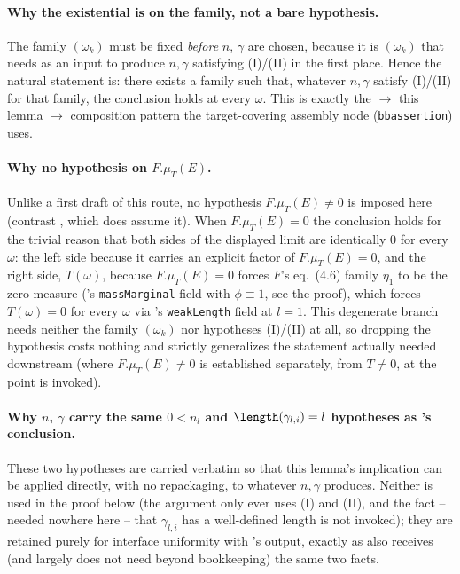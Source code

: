\begin{lemma}
  \paragraph{Why the existential is on the family, not a bare hypothesis.} The family $(\omega_k)$
  must be fixed \emph{before} $n$, $\gamma$ are chosen, because it is $(\omega_k)$ that
   needs as an input to produce $n,\gamma$ satisfying (I)/(II) in the
  first place. Hence the natural statement is: there exists a family such that, whatever $n,\gamma$
  satisfy (I)/(II) for that family, the conclusion holds at every $\omega$. This is exactly the
  $\to$ this lemma $\to$  composition pattern the
  target-covering assembly node (\texttt{bbassertion}) uses.

  \paragraph{Why no hypothesis on $F.\mu_T(E)$.} Unlike a first draft of this route, no hypothesis
  $F.\mu_T(E)\ne0$ is imposed here (contrast , which does assume it).
  When $F.\mu_T(E)=0$ the conclusion holds for the trivial reason that both sides of the displayed
  limit are identically $0$ for every $\omega$: the left side because it carries an explicit factor
  of $F.\mu_T(E)=0$, and the right side, $T(\omega)$, because $F.\mu_T(E)=0$ forces $F$'s eq.~(4.6)
  family $\eta_1$ to be the zero measure ('s \texttt{massMarginal} field with
  $\phi\equiv1$, see the proof), which forces $T(\omega)=0$ for every $\omega$ via
  's \texttt{weakLength} field at $l=1$. This degenerate branch needs neither the
  family $(\omega_k)$ nor hypotheses (I)/(II) at all, so dropping the hypothesis costs nothing and
  strictly generalizes the statement actually needed downstream (where $F.\mu_T(E)\ne0$ is
  established separately, from $T\ne0$, at the point  is invoked).

  \paragraph{Why $n$, $\gamma$ carry the same $0<n_l$ and $\length(\gamma_{l,i})=l$ hypotheses as
  's conclusion.} These two hypotheses are carried verbatim so that
  this lemma's implication can be applied directly, with no repackaging, to whatever $n,\gamma$
   produces. Neither is used in the proof below (the argument only ever
  uses (I) and (II), and the fact -- needed nowhere here -- that $\gamma_{l,i}$ has a well-defined
  length is not invoked); they are retained purely for interface uniformity with
  's output, exactly as  also receives (and largely
  does not need beyond bookkeeping) the same two facts.


\end{lemma}
